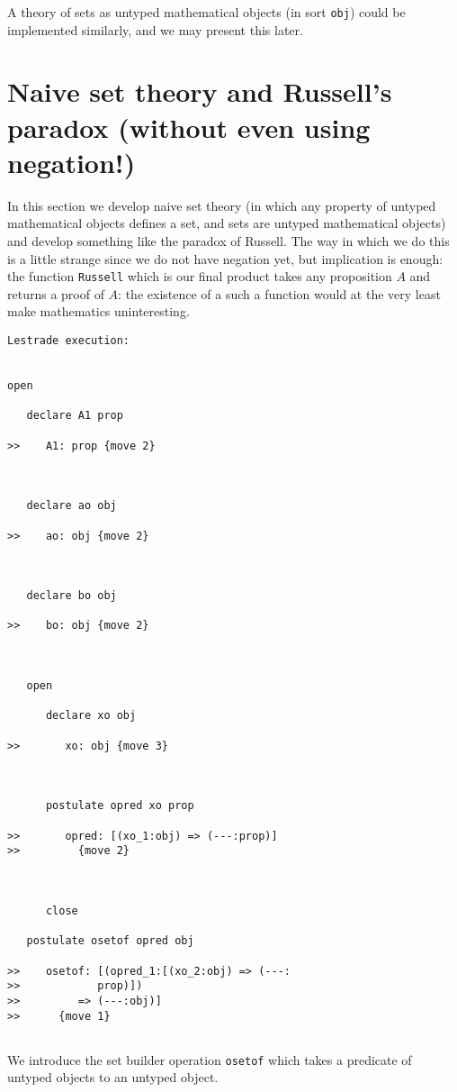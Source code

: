\documentclass[12pt]{article}
\begin{document}
A theory of sets as untyped mathematical objects (in sort {\tt obj}) could be implemented similarly, and we may present this later.

\section{Naive set theory and Russell's paradox (without even using negation!)}

In this section we develop naive set theory (in which any property of untyped mathematical objects defines a set, and sets are untyped mathematical objects)
and develop something like the paradox of Russell.  The way in which we do this is a little strange since we do not have negation yet, but implication is enough:  the function {\tt Russell} which is our final product takes any proposition $A$ and returns a proof of $A$:  the existence of a such a function would at the very least make mathematics uninteresting.

\begin{verbatim}Lestrade execution:


open

   declare A1 prop

>>    A1: prop {move 2}



   declare ao obj

>>    ao: obj {move 2}



   declare bo obj

>>    bo: obj {move 2}



   open

      declare xo obj

>>       xo: obj {move 3}



      postulate opred xo prop

>>       opred: [(xo_1:obj) => (---:prop)]
>>         {move 2}



      close

   postulate osetof opred obj

>>    osetof: [(opred_1:[(xo_2:obj) => (---:
>>            prop)])
>>         => (---:obj)]
>>      {move 1}


\end{verbatim}

We introduce the set builder operation {\tt osetof} which takes a predicate of untyped objects to an untyped object.
\end{document}
